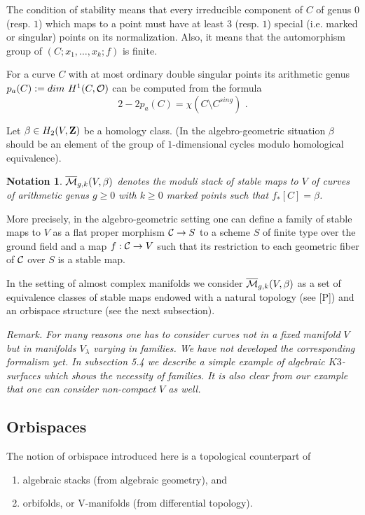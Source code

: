 \documentclass{amsart}
\newtheorem*{notation}{Notation}
\begin{document}
The condition of stability means that every irreducible component
of $C$ of genus $0$ (resp. $1$) which maps to a point must have at least $3$
(resp. $1$) special (i.e. marked or singular) points on its normalization.
Also, it means that the automorphism group of $(C;x_1,\dots,x_k;f)$ is finite.

For a curve $C$ with at most ordinary double singular points its arithmetic
genus $p_a(C):=dim\,\,H^1(C,\mathcal O)$ can be computed
 from the formula
$$2-2p_a(C)=\chi(C\setminus C ^{sing})\,\,.$$

Let $\beta\in H_2(V,\mathbf Z)$ be a homology class. (In the algebro-geometric
situation $\beta$ should be an element of the group of $1$-dimensional cycles
modulo homological equivalence).


\begin{notation} $\overline{\mathcal{M}}_{g,k}(V,\beta)$ denotes the moduli stack
of stable maps to $V$ of curves of arithmetic genus $g\ge 0$ with $k\ge 0$
marked points such that $f_*[C]=\beta$.
\end{notation}

More precisely, in the algebro-geometric setting one can define a family of
stable maps to $V$ as a flat proper morphism $\mathcal C\to S$
 to a scheme $S$ of finite type over the ground field and a map
$f:\mathcal C\to V$ such that its restriction to each geometric fiber of $\mathcal C$
over $S$ is a stable map.

In the setting of almost complex manifolds we consider $\overline{\mathcal{M}}_{g,k}(V,\beta)$ as a
set of equivalence classes of stable maps endowed with a natural topology (see
[P]) and an orbispace structure (see the next subsection).


\it Remark\rm. For many reasons one has to consider curves not in a fixed
manifold $V$ but in manifolds $V_{\lambda}$ varying in families. We have not
developed the corresponding formalism yet.
  In subsection 5.4 we describe a simple example of algebraic  $K3$-surfaces
which shows the necessity of families.
 It is also clear from our example that one can consider non-compact $V$ as
well.



\subsection{Orbispaces}

The notion of orbispace introduced here is  a topological counterpart
of
\begin{enumerate}
\item algebraic stacks (from algebraic geometry), and
\item orbifolds, or V-manifolds (from differential topology).
\end{enumerate}
\end{document}
